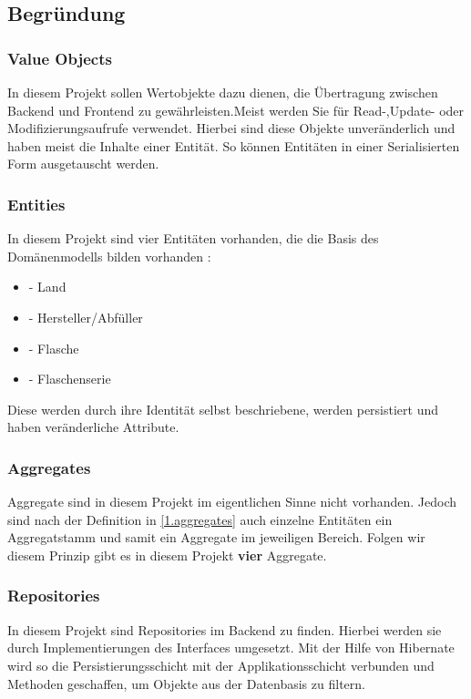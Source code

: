 		\subsection{Begründung}
		
			\subsubsection{Value Objects}
			In diesem Projekt sollen Wertobjekte dazu dienen, die Übertragung zwischen Backend und Frontend zu gewährleisten.Meist werden Sie für Read-,Update- oder Modifizierungsaufrufe verwendet. Hierbei sind diese  Objekte unveränderlich und haben meist die Inhalte einer Entität. So können Entitäten in einer Serialisierten Form ausgetauscht werden.
			
			\subsubsection{Entities}
			In diesem Projekt sind vier Entitäten vorhanden, die die Basis des Domänenmodells bilden vorhanden :
			\begin{itemize}
				\item {} - Land
				\item {} - Hersteller/Abfüller
				\item {} - Flasche
				\item {} - Flaschenserie
			\end{itemize}
			Diese werden durch ihre Identität selbst beschriebene, werden persistiert und haben veränderliche Attribute.
			
			\subsubsection{Aggregates}
			Aggregate sind in diesem Projekt im eigentlichen Sinne nicht vorhanden. Jedoch sind nach der Definition in \cref{1.aggregates} auch einzelne Entitäten ein Aggregatstamm und samit ein Aggregate im jeweiligen Bereich. Folgen wir diesem Prinzip gibt es in diesem Projekt \textbf{vier} Aggregate.
			
			\subsubsection{Repositories}
			In diesem Projekt sind Repositories im Backend zu finden. Hierbei werden sie durch Implementierungen des Interfaces  umgesetzt. Mit der Hilfe von Hibernate wird so die Persistierungsschicht mit der Applikationsschicht verbunden und Methoden geschaffen, um Objekte aus der Datenbasis zu filtern.
			
